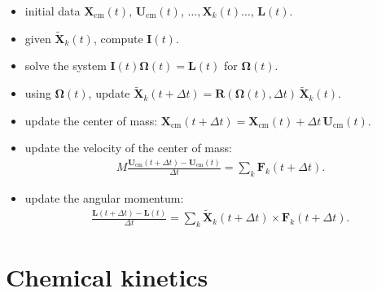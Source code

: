 \documentclass[10pt]{article}
\newcommand{\bs}[1]{{\boldsymbol #1}}
\begin{document}
\begin{itemize}
\item initial data ${\bs X}_\text{cm}(t)$, ${\bs U}_\text{cm}(t)$, $\ldots, {\bs X}_k(t) \ldots$, ${\bs L}(t)$.
\item given $\tilde{{\bs X}}_k(t)$, compute ${\bs I}(t)$.
\item solve the system ${\bs I}(t){\bs \Omega}(t) = {\bs L}(t)$ for ${\bs \Omega}(t)$.
\item using ${\bs \Omega}(t)$, update $\tilde{{\bs X}}_k(t + \Delta t) = {\bs R}({\bs \Omega}(t), \Delta t)\, \tilde{{\bs X}}_k(t)$.
\item update the center of mass: ${\bs X}_\text{cm}(t + \Delta t) = {\bs X}_\text{cm}(t) + \Delta t \, {\bs U}_\text{cm}(t)$.
\item update the velocity of the center of mass:
\begin{align*}
M \frac{{\bs U}_\text{cm}(t + \Delta t) - {\bs U}_\text{cm}(t)}{\Delta t} = \sum_k {\bs F}_k(t + \Delta t).
\end{align*}
\item update the angular momentum:
\begin{align*}
\frac{{\bs L}(t + \Delta t) - {\bs L}(t)}{\Delta t} = \sum_k \tilde{{\bs X}}_k(t + \Delta t) \times {\bs F}_k(t + \Delta t).
\end{align*}
\end{itemize}

\newpage
\section{Chemical kinetics}
\end{document}
